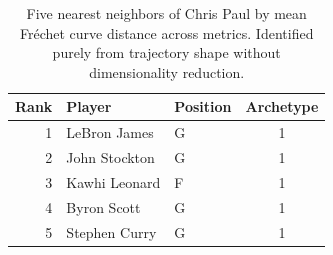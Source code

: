 \begin{table}[htbp]
  \centering\small
  \begin{tabular}{rllc}
    \toprule
    Rank & Player & Position & Archetype \\
    \midrule
    1 & LeBron James & G & 1 \\
    2 & John Stockton & G & 1 \\
    3 & Kawhi Leonard & F & 1 \\
    4 & Byron Scott & G & 1 \\
    5 & Stephen Curry & G & 1 \\
    \bottomrule
  \end{tabular}
  \caption{Five nearest neighbors of Chris Paul by mean Fr\'{e}chet curve distance across metrics. Identified purely from trajectory shape without dimensionality reduction.}
  \label{tab:Chris_Paul_frechet_curve_neighbors}
\end{table}

